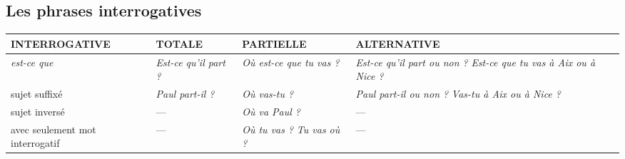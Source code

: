 \documentclass[UTF8]{report}
\begin{document}
\subsection{Les phrases interrogatives}
\begin{table}[H]
\centering
\begin{adjustbox}{max width=\textwidth}
\begin{tabular}{|p{}|p{}|p{}|p{}|}
\hline
\rowcolor{cyan!20}
\textbf{INTERROGATIVE} & \textbf{TOTALE} & \textbf{PARTIELLE} & \textbf{ALTERNATIVE} \\
\hline

\textit{est-ce que} &
\textit{Est-ce qu’il part ?} &
\textit{Où est-ce que tu vas ?} &
\textit{Est-ce qu’il part ou non ?} \newline \textit{Est-ce que tu vas à Aix ou à Nice ?} \\
\hline

sujet suffixé &
\textit{Paul part-il ?} &
\textit{Où vas-tu ?} &
\textit{Paul part-il ou non ?} \newline \textit{Vas-tu à Aix ou à Nice ?} \\
\hline

sujet inversé &
--- &
\textit{Où va Paul ?} &
--- \\
\hline

avec seulement mot interrogatif &
--- &
\textit{Où tu vas ?} \newline \textit{Tu vas où ?} &
--- \\
\hline
\end{tabular}
\end{adjustbox}
\end{table}
\end{document}
